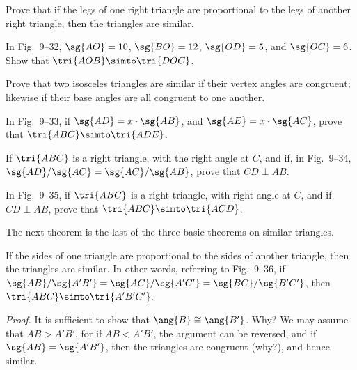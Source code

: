 \documentclass[11pt]{book}
\theoremstyle{bkplain}
\theoremstyle{XIplainnote}
\theoremstyle{bkplain}
\theoremstyle{bkplain}
\begin{document}
\begin{exercisecols}
\begin{exlist}
\item Prove that if the legs of one right triangle are proportional to the legs
      of another right triangle, then the triangles are similar.
\item In Fig.~9--32, $\sg{AO} = 10$, $\sg{BO} = 12$, $\sg{OD} = 5$, and
      $\sg{OC} = 6$. Show that $\tri{AOB} \simto \tri{DOC}$.
\exfig{\FIGIXTHIRTYTWO}
\item Prove that two isosceles triangles are similar if their vertex angles are
      congruent; likewise if their base angles are all congruent to one another.
\item In Fig.~9--33, if $\sg{AD} = x \cdot \sg{AB}$, and $\sg{AE} = x \cdot
      \sg{AC}$, prove that $\tri{ABC} \simto \tri{ADE}$.
\exfig{\FIGIXTHIRTYTHREE}
\item If $\tri{ABC}$ is a right triangle, with the right angle at $C$, and if, in
      Fig.~9--34, $\sg{AD}/\sg{AC} = \sg{AC}/\sg{AB}$, prove that $CD \perp AB$.
\exfig{\FIGIXTHIRTYFOUR}
\item[\stex 6.] In Fig.~9--35, if $\tri{ABC}$ is a right triangle, with right
      angle at $C$, and if $CD \perp AB$, prove that $\tri{ABC} \simto
      \tri{ACD}$.
\exfig{\FIGIXTHIRTYFIVE}
\end{exlist}
\end{exercisecols}

The next theorem is the last of the three basic theorems on similar triangles.

\begin{theorem}
If the sides of one triangle are proportional to the sides of another triangle,
then the triangles are similar. In other words, referring to Fig.~9--36, if
$\sg{AB}/\sg{A'B'} = \sg{AC}/\sg{A'C'} = \sg{BC}/\sg{B'C'}$, then
$\tri{ABC} \simto \tri{A'B'C'}$.
\end{theorem}

\noindent\emph{Proof.} It is sufficient to show that $\ang{B} \cong \ang{B'}$.
Why? We may assume that $AB > A'B'$, for if $AB < A'B'$, the argument can be
reversed, and if $\sg{AB} = \sg{A'B'}$, then the triangles are congruent (why?),
and hence similar.

\FIGIXTHIRTYSIX

\begin{steps}
\end{steps}
\end{document}
